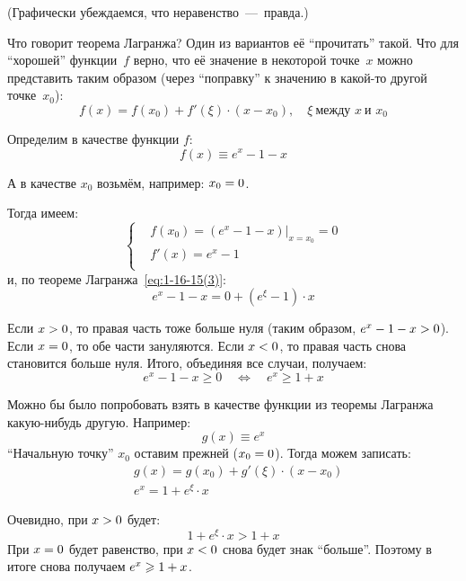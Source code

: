 \documentclass[a4paper,12pt]{article}
\begin{document}
  \begin{solution}
    (Графически убеждаемся, что неравенство~---~правда.)

    Что говорит теорема Лагранжа?
    Один из вариантов её ``прочитать'' такой.
    Что для ``хорошей'' функции~$f$ верно, что её значение в некоторой точке~$x$ можно представить таким образом (через ``поправку'' к значению в какой-то другой точке~$x_0$):
    \begin{equation}\label{eq:1-16-15(3)}
      f(x) = f(x_0) + f'(\xi) \cdot (x - x_0),\quad \xi\ \mbox{между } x\ \mbox{и } x_0
    \end{equation}

    Определим в качестве функции $f$:
    \[
      f(x) \equiv e^x - 1 - x
    \]

    А в качестве $x_0$ возьмём, например: $x_0 \hm= 0$.

    Тогда имеем:
    \[
      \left\{
        \begin{aligned}
          &f(x_0) = \left(e^x - 1 - x\right)|_{x = x_0} = 0\\
          &f'(x) = e^x - 1\\
        \end{aligned}
      \right.
    \]
    и, по теореме Лагранжа~\eqref{eq:1-16-15(3)}:
    \[
      e^x - 1 - x = 0 + \left(e^{\xi} - 1\right) \cdot x
    \]

    Если $x \hm> 0$, то правая часть тоже больше нуля (таким образом, $e^x \hm- 1 \hm- x \hm> 0$).
    Если $x \hm= 0$, то обе части зануляются.
    Если $x \hm< 0$, то правая часть снова становится больше нуля.
    Итого, объединяя все случаи, получаем:
    \[
      e^x - 1 - x \geq 0
        \quad\Leftrightarrow\quad e^x \geq 1 + x
    \]

    \medskip

    Можно бы было попробовать взять в качестве функции из теоремы Лагранжа какую-нибудь другую.
    Например:
    \[
      g(x) \equiv e^x
    \]
    ``Начальную точку'' $x_0$ оставим прежней ($x_0 \hm= 0$).
    Тогда можем записать:
    \[
      \begin{aligned}
        &g(x) = g(x_0) + g'(\xi) \cdot (x - x_0)\\
        &e^x = 1 + e^{\xi} \cdot x
      \end{aligned}
    \]

    Очевидно, при $x \hm> 0$ будет:
    \[
      1 + e^{\xi} \cdot x > 1 + x
    \]
    При $x \hm= 0$ будет равенство, при $x \hm< 0$ снова будет знак ``больше''.
    Поэтому в итоге снова получаем $e^x \hm\geq 1 \hm+ x$.
  \end{solution}
\end{document}
